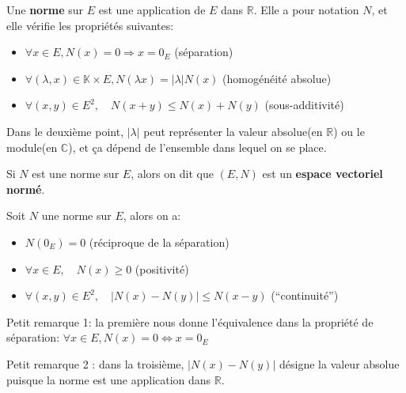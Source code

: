 \documentclass{article}
\begin{document}
\begin{tcolorbox}[colback=red!5!white,colframe=red!75!black,title=Définition 1.1]

Une \textbf{norme} sur $E$ est une application de $E$ dans $\mathbb{R}$. Elle a pour notation $N$, et elle vérifie les propriétés suivantes:

\begin{itemize}
 \item $\forall x \in E, N(x)=0 \Rightarrow x = 0_E$  \hfill (séparation)
 \item $\forall (\lambda, x) \in \mathbb{K} \times E, N(\lambda x) = |\lambda|N(x)$  \hfill (homogénéité absolue)
 \item $\forall (x,y) \in E^2, \quad N(x+y) \leq N(x) + N(y)$ \hfill (sous-additivité)
 
\end{itemize}

\tcblower

Dans le deuxième point, $|\lambda|$ peut représenter la valeur absolue(en $\mathbb{R}$) ou le module(en $\mathbb{C}$), et \c ca dépend de l'ensemble dans lequel on se place.

\end{tcolorbox}

\begin{tcolorbox}[colback=red!5!white,colframe=red!75!black,title=Définition 1.2]

Si $N$ est une norme sur $E$, alors on dit que $(E,N)$ est un \textbf{espace vectoriel normé}.

\end{tcolorbox}

\begin{tcolorbox}[colback=blue!5!white,colframe=blue!75!black,title=Proposition 1.1]

Soit $N$ une norme sur $E$, alors on a:

\begin{itemize}
    \item $N(0_E) = 0$ \hfill (réciproque de la séparation)
    \item $\forall x \in E, \quad N(x) \geq 0$ \hfill (positivité)
    \item $\forall (x,y) \in E^2, \quad |N(x) - N(y)| \leq N(x - y)$ \hfill (``continuité'')
    
\end{itemize}

\tcblower

Petit remarque 1: la première nous donne l'équivalence dans la propriété de séparation: $\forall x \in E, N(x) = 0 \Longleftrightarrow x = 0_E$

Petit remarque 2 : dans la troisième, $|N(x) - N(y)|$ désigne la valeur absolue puisque la norme est une application dans $\mathbb{R}$.

\end{tcolorbox}
\end{document}
